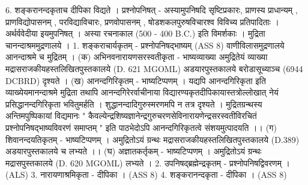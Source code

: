 6. शङ्करानन्दकृताच दीपिका विद्यते । 
प्रश्नोपनिषत् - 
अस्यामुपनिषदि सृष्टिप्रकारः, प्राणस्य प्राधान्यम् , प्राणविद्योपासनम् , परविद्याविचारः, प्रणवोपासनम् , षोडशकलपुरुषविचारश्व विविच्य प्रतिपादिताः । अर्थर्ववेदीया इयमुपनिषत् । अस्या रचनाकाल (500 - 400 B.C.) इति विमर्शकाः । मुद्रिता चानन्दाश्रममुद्रणालये । 
1. शङ्कराचार्यकृतम् - प्रश्नोपनिषद्भाष्यम् (ASS 8) वाणीविलासमुद्रणालये आनन्दाश्रमे च मुद्रितम् । 
(क) अभिनवनारायणसरस्वतीकृता - भाष्यव्याख्या 
अमुद्रितेयं व्याख्या मद्रासराजकीयहस्तलिखितपुस्तकालये (D. 621 MGOML)  अडयारपुस्तकालये बरोडासूच्याञ्च (6944 DCBRD) दृश्यते । 
(ख) आनन्दगिरिकृतम् - भाष्यटिप्पणम् ।
यद्यपि आनन्दगिरिकृता इति व्याख्येयमानन्दाश्रमे मुद्रिता तथापि आनन्दगिरेरर्वाचीनाया विद्यारण्यकृतदीपिकायास्तत्रोल्लोखात् नेयं प्रसिद्धानन्दगिरिकृता भवितुमर्हति । शुद्धानन्दादिगुरुस्मरणमपि न तत्र दृश्यते । मुद्रितग्रन्थस्य अन्तिमपुष्पिकायां विद्यमानः " कैवल्येन्द्रशिष्यज्ञानेन्द्रगुरुचरणसेविनारायणेन्द्रसरस्वतीविरचितं प्रश्नोपनिषद्भाष्यविवरणं समाप्तम् " इति पाठभेदोऽपि आनन्दगिरिकृतत्वे संशयमुत्पादयति ।। 
(ग) शिवानन्दयतिकृतम् - भाष्यटिप्पणम् । अमुद्रितोऽयं ग्रन्थः मद्रासराजकीयहस्तलिखितपुस्तकालये (D.389) अडयारपुस्तकालये च लभ्यते ।।
(घ) अज्ञातकर्तृकम् - भाष्यटिप्पणम् । अमुद्रितोऽयं ग्रन्थः मद्रासपुस्तकालये (D. 620 MGOML) लभ्यते । 
2. उपनिषद्ब्रह्मेन्द्रकृतम् - प्रश्नोपनिषद्विवरणम् । (ALS)
3. नारायणाश्रमिकृता - दीपिका । (ASS 8)
4. शङ्करानन्दकृता - दीपिका । (ASS 8)



